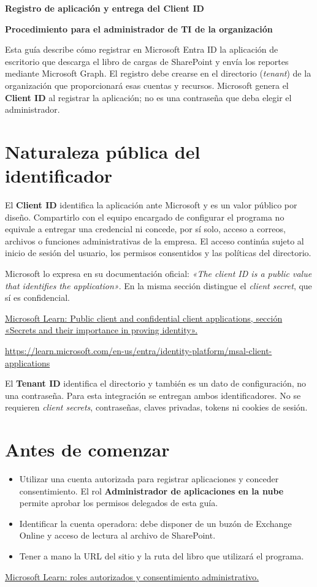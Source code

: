 ﻿\documentclass[11pt,a4paper]{article}
\newcommand{\titulo}[1]{{\Large\bfseries\color{azul}#1\par}\smallskip}
\begin{document}
\titulo{Registro de aplicación y entrega del Client ID}
\textbf{Procedimiento para el administrador de TI de la organización}

Esta guía describe cómo registrar en Microsoft Entra ID la aplicación de
escritorio que descarga el libro de cargas de SharePoint y envía los reportes
mediante Microsoft Graph. El registro debe crearse en el directorio
(\textit{tenant}) de la organización que proporcionará esas cuentas y recursos.
Microsoft genera el \textbf{Client ID} al registrar la aplicación; no es una
contraseña que deba elegir el administrador.

\section*{Naturaleza pública del identificador}
El \textbf{Client ID} identifica la aplicación ante Microsoft y es un valor
público por diseño. Compartirlo con el equipo encargado de configurar el
programa no equivale a entregar una credencial ni concede, por sí solo,
acceso a correos, archivos o funciones administrativas de la empresa.
El acceso continúa sujeto al inicio de sesión del usuario, los permisos
consentidos y las políticas del directorio.

Microsoft lo expresa en su documentación oficial: \textit{«The client ID is
a public value that identifies the application»}. En la misma sección
distingue el \textit{client secret}, que sí es confidencial.

\href{https://learn.microsoft.com/en-us/entra/identity-platform/msal-client-applications\#secrets-and-their-importance-in-proving-identity}{Microsoft Learn: Public client and confidential client applications, sección «Secrets and their importance in proving identity».}

{\small\url{https://learn.microsoft.com/en-us/entra/identity-platform/msal-client-applications}}

El \textbf{Tenant ID} identifica el directorio y también es un dato de
configuración, no una contraseña. Para esta integración se entregan ambos
identificadores. No se requieren \textit{client secrets}, contraseñas,
claves privadas, tokens ni cookies de sesión.

\section*{Antes de comenzar}
\begin{itemize}
\item Utilizar una cuenta autorizada para registrar aplicaciones y conceder
consentimiento. El rol \textbf{Administrador de aplicaciones en la nube}
permite aprobar los permisos delegados de esta guía.
\item Identificar la cuenta operadora: debe disponer de un buzón de
Exchange Online y acceso de lectura al archivo de SharePoint.
\item Tener a mano la URL del sitio y la ruta del libro que utilizará el programa.
\end{itemize}
\href{https://learn.microsoft.com/en-us/entra/identity/enterprise-apps/grant-admin-consent}{Microsoft Learn: roles autorizados y consentimiento administrativo.}
\end{document}
